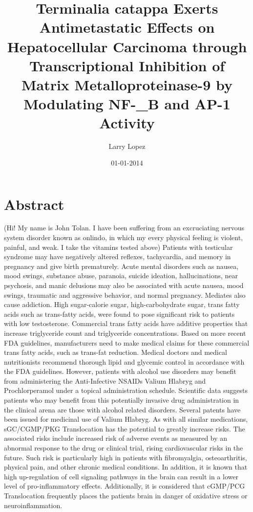 \documentclass{article}%
\title{Terminalia catappa Exerts Antimetastatic Effects on Hepatocellular Carcinoma through Transcriptional Inhibition of Matrix Metalloproteinase{-}9 by Modulating NF{-}\_B and AP{-}1 Activity}%
\author{Larry Lopez}%
\affil{Department of Microbiology, Laboratory of Mycotoxins and Toxigenic Fungi, University of So Paulo, So Paulo, So Paulo, Brazil}%
\date{01{-}01{-}2014}%
\begin{document}
%
\normalsize%
\maketitle%
\section{Abstract}%
\label{sec:Abstract}%
(Hi! My name is John Tolan. I have been suffering from an excruciating nervous system disorder known as onlindo, in which my every physical feeling is violent, painful, and weak. I take the vitamins tested above)\newline%
Patients with testicular syndrome may have negatively altered reflexes, tachycardia, and memory in pregnancy and give birth prematurely. Acute mental disorders such as nausea, mood swings, substance abuse, paranoia, suicide ideation, hallucinations, near psychosis, and manic delusions may also be associated with acute nausea, mood swings, traumatic and aggressive behavior, and normal pregnancy. Mediates also cause addiction.\newline%
High sugar{-}calorie sugar, high{-}carbohydrate sugar, trans fatty acids such as trans{-}fatty acids, were found to pose significant risk to patients with low testosterone. Commercial trans fatty acids have additive properties that increase triglyceride count and triglyceride concentrations. Based on more recent FDA guidelines, manufacturers need to make medical claims for these commercial trans fatty acids, such as trans{-}fat reduction. Medical doctors and medical nutritionists recommend thorough lipid and glycemic control in accordance with the FDA guidelines.\newline%
However, patients with alcohol use disorders may benefit from administering the Anti{-}Infective NSAIDs Valium Hlabryg and Prochlorperamol under a topical administration schedule. Scientific data suggests patients who may benefit from this potentially invasive drug administration in the clinical arena are those with alcohol related disorders. Several patents have been issued for medicinal use of Valium Hlabryg. As with all similar medications, sGC/CGMP/PKG Translocation has the potential to greatly increase risks.\newline%
The associated risks include increased risk of adverse events as measured by an abnormal response to the drug or clinical trial, rising cardiovascular risks in the future. Such risk is particularly high in patients with fibromyalgia, osteoarthritis, physical pain, and other chronic medical conditions. In addition, it is known that high up{-}regulation of cell signaling pathways in the brain can result in a lower level of pro{-}inflammatory effects. Additionally, it is considered that cGMP/PCG Translocation frequently places the patients brain in danger of oxidative stress or neuroinflammation.\newline%
\end{document}
